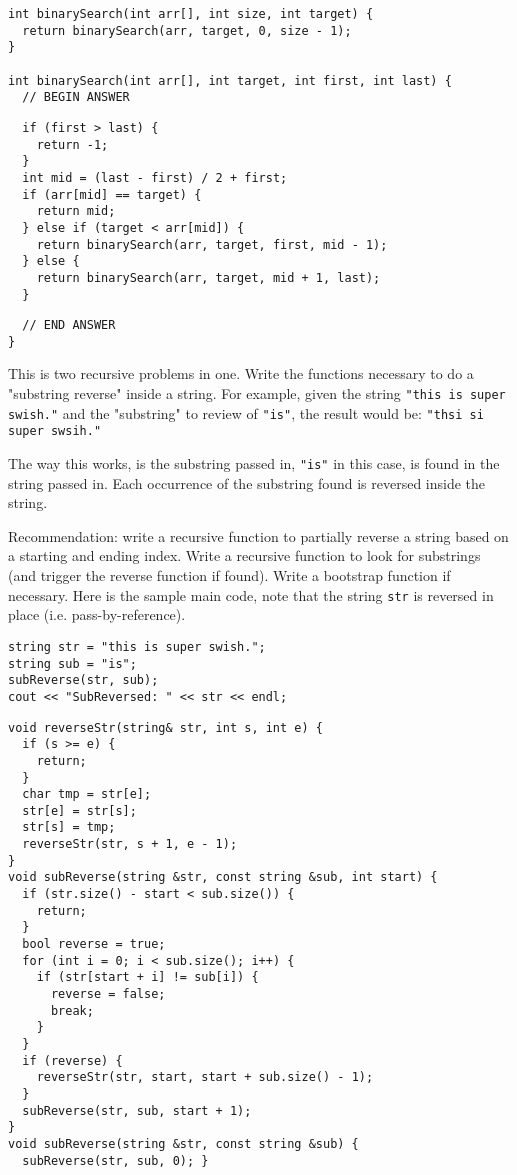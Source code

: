 \documentclass[11pt,answers]{exam}
\begin{document}
\begin{questions}
\begin{verbatim}
int binarySearch(int arr[], int size, int target) {
  return binarySearch(arr, target, 0, size - 1);
}

int binarySearch(int arr[], int target, int first, int last) {
  // BEGIN ANSWER
\end{verbatim}

\begin{solution}[4in]
\begin{verbatim}
  if (first > last) {
    return -1;
  }
  int mid = (last - first) / 2 + first;
  if (arr[mid] == target) {
    return mid;
  } else if (target < arr[mid]) {
    return binarySearch(arr, target, first, mid - 1);
  } else {
    return binarySearch(arr, target, mid + 1, last);
  }
\end{verbatim}
\end{solution}

\begin{verbatim}
  // END ANSWER
}
\end{verbatim}

\newpage
\question[20] This is two recursive problems in one. Write the functions necessary to do a "substring reverse" inside a string.
For example, given the string \newline
{\tt  "this is super swish."} \newline
and the "substring" to review of {\tt "is"}, the result would be:\newline
{\tt  "thsi si super swsih."}
\par
The way this works, is the substring passed in, {\tt "is"} in this case, is found in the string passed in. Each occurrence of the substring found is reversed inside the string.
\par
Recommendation: write a recursive function to partially reverse a string based on a starting and ending index. Write a recursive function to look for substrings (and trigger the reverse function if found). Write a bootstrap function if necessary. Here is the sample main code, note that the string {\tt str} is reversed in place (i.e. pass-by-reference).
\begin{lstlisting}
string str = "this is super swish.";
string sub = "is";
subReverse(str, sub);
cout << "SubReversed: " << str << endl;  
\end{lstlisting}

\begin{solution}
\begin{lstlisting}
void reverseStr(string& str, int s, int e) {
  if (s >= e) {
    return;
  }
  char tmp = str[e];
  str[e] = str[s];
  str[s] = tmp;
  reverseStr(str, s + 1, e - 1);
}
void subReverse(string &str, const string &sub, int start) {
  if (str.size() - start < sub.size()) {
    return;
  }
  bool reverse = true;
  for (int i = 0; i < sub.size(); i++) {
    if (str[start + i] != sub[i]) {
      reverse = false;
      break;
    }    
  }
  if (reverse) {
    reverseStr(str, start, start + sub.size() - 1);
  }
  subReverse(str, sub, start + 1);
}
void subReverse(string &str, const string &sub) {
  subReverse(str, sub, 0); }  
\end{lstlisting}
\end{solution}


\end{questions}
\end{document}
